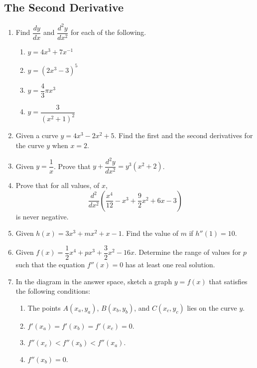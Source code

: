 \documentclass{report}
\begin{document}
\begin{multicols}{2}
      \section{The Second Derivative}
      \begin{enumerate}
            \item Find $\dfrac{dy}{dx}$ and $\dfrac{d^2y}{dx^2}$ for each of the following.
                  \begin{enumerate}
                        \item $y = 4x^3 + 7x^{-1}$
                        \item $y = {(2x^3-3)}^5$
                        \item $y = \dfrac{4}{3}\pi x^3$
                        \item $y = \dfrac{3}{{(x^2 + 1)}^2}$
                  \end{enumerate}
            \item Given a curve $y = 4x^3 - 2x^2 + 5$. Find the first and the second derivatives
                  for the curve $y$ when $x = 2$.
            \item Given $y = \dfrac{1}{x}$. Prove that $y + \dfrac{d^2y}{dx^2} = y^3(x^2 + 2)$.
            \item Prove that for all values, of $x$, \[\dfrac{d^2}{dx^2}\left(\dfrac{x^4}{12} -
                        x^3 + \dfrac{9}{2}x^2 + 6x - 3\right)\] is never negative.
            \item Given $h(x) = 3x^3 + mx^2 + x - 1$. Find the value of $m$ if $h''(1) = 10$.
            \item Given $f(x) = \dfrac{1}{2}x^4 + px^3 + \dfrac{3}{2}x^2 - 16x$. Determine the
                  range of values for $p$ such that the equation $f''(x) = 0$ has at least one
                  real solution.
            \item In the diagram in the answer space, sketch a graph $y = f(x)$ that satisfies
                  the following conditions:
                  \begin{enumerate}
                        \item The points $A(x_a, y_a)$, $B(x_b, y_b)$, and $C(x_c, y_c)$ lies on the curve
                              $y$.
                        \item $f'(x_a) = f'(x_b) = f'(x_c) = 0$.
                        \item $f''(x_c) < f''(x_b) < f''(x_a)$.
                        \item $f''(x_b) = 0$.
                  \end{enumerate}
      \end{enumerate}

\end{multicols}
\end{document}

